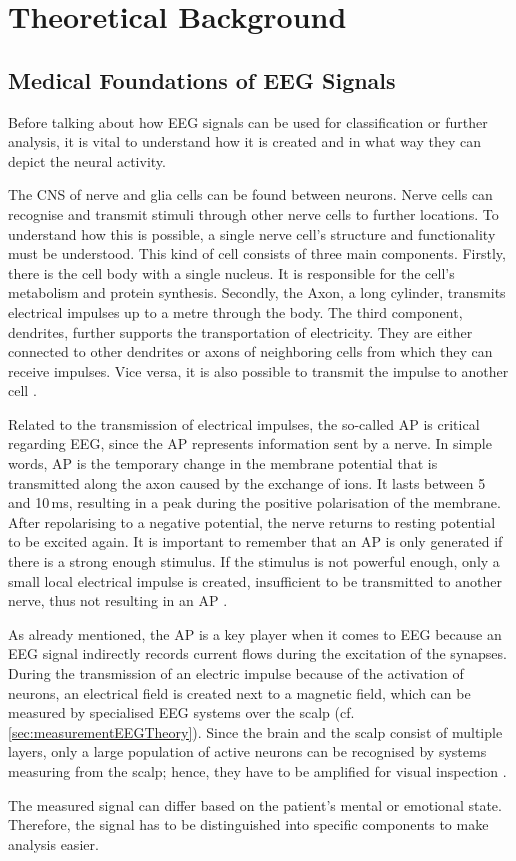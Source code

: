 \chapter{Theoretical Background}\label{chapter:theoretical_background}
\acresetall
  \section{Medical Foundations of EEG Signals} \label{sec:medicalFoundation}
    Before talking about how \ac{EEG} signals can be used for classification or further analysis, it is vital to understand how it is created and in what way they can depict the neural activity.\par
    The \ac{CNS} of nerve and glia cells can be found between neurons. Nerve cells can recognise and transmit stimuli through other nerve cells to further locations. To understand how this is possible, a single nerve cell's structure and functionality must be understood. This kind of cell consists of three main components. Firstly, there is the cell body with a single nucleus. It is responsible for the cell's metabolism and protein synthesis. Secondly, the Axon, a long cylinder, transmits electrical impulses up to a metre through the body. The third component, dendrites, further supports the transportation of electricity. They are either connected to other dendrites or axons of neighboring cells from which they can receive impulses. Vice versa, it is also possible to transmit the impulse to another cell \cite{sanei2021eeg}. \par
    Related to the transmission of electrical impulses, the so-called \ac{AP} is critical regarding \ac{EEG}, since the \ac{AP} represents information sent by a nerve. In simple words, \ac{AP} is the temporary change in the membrane potential that is transmitted along the axon caused by the exchange of ions. It lasts between 5 and 10\,ms, resulting in a peak during the positive polarisation of the membrane. After repolarising to a negative potential, the nerve returns to resting potential to be excited again. It is important to remember that an \ac{AP} is only generated if there is a strong enough stimulus. If the stimulus is not powerful enough, only a small local electrical impulse is created, insufficient to be transmitted to another nerve, thus not resulting in an \ac{AP} \cite{sanei2021eeg}. \par
    As already mentioned, the \ac{AP} is a key player when it comes to \ac{EEG} because an \ac{EEG} signal indirectly records current flows during the excitation of the synapses. During the transmission of an electric impulse because of the activation of neurons, an electrical field is created next to a magnetic field, which can be measured by specialised \ac{EEG} systems over the scalp (cf. \autoref{sec:measurementEEGTheory}). Since the brain and the scalp consist of multiple layers, only a large population of active neurons can be recognised by systems measuring from the scalp; hence, they have to be amplified for visual inspection \cite{sanei2021eeg}. \par
    The measured signal can differ based on the patient's mental or emotional state. Therefore, the signal has to be distinguished into specific components to make analysis easier.


